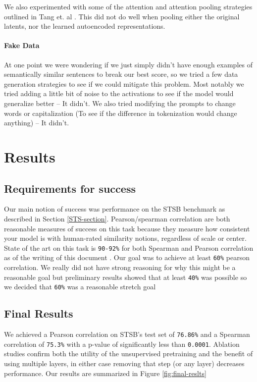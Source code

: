 \documentclass{article}
\begin{document}
We also experimented with some of the attention and attention pooling strategies outlined in Tang et. al \cite{tang2024poolingattentioneffectivedesigns}. This did not do well when pooling either the original latents, nor the learned autoencoded representations.

\paragraph*{Fake Data}
At one point we were wondering if we just simply didn't have enough examples of semantically similar sentences to break our best score, so we tried a few data generation strategies to see if we could mitigate this problem. Most notably we tried adding a little bit of noise to the activations to see if the model would generalize better -- It didn't. We also tried modifying the prompts to change words or capitalization (To see if the difference in tokenization would change anything) -- It didn't.

\section{Results}
\subsection{Requirements for success}
Our main notion of success was performance on the STSB \cite{STS} benchmark as described in Section \ref{STS-section}. Pearson/spearman correlation are both reasonable measures of success on this task because they measure how consistent your model is with human-rated similarity notions, regardless of scale or center. State of the art on this task is \verb|90-92%| for both Spearman and Pearson correlation as of the writing of this document \cite{muennighoff2022mteb}. Our goal was to achieve at least \verb|60%| pearson correlation. We really did not have strong reasoning for why this might be a reasonable goal but preliminary results showed that at least \verb|40%| was possible so we decided that \verb|60%| was a reasonable stretch goal

\subsection{Final Results}
We achieved a Pearson correlation on STSB's test set of \verb|76.86%| and a Spearman correlation of \verb|75.3%| with a p-value of significantly less than \verb|0.0001|. Ablation studies confirm both the utility of the unsupervised pretraining and the benefit of using multiple layers, in either case removing that step (or any layer) decreases performance. Our results are summarized in Figure \ref{fig:final-reslts}
\end{document}
